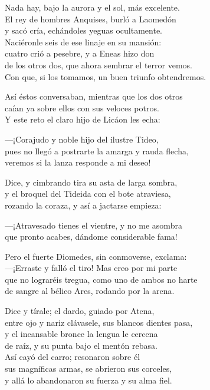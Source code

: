 Nada hay, bajo la aurora y el sol, más excelente.\\
El rey de hombres Anquises, burló a Laomedón\\
y sacó cría, echándoles yeguas ocultamente.\\
Naciéronle seis de ese linaje en su mansión:\\
cuatro crió a pesebre, y a Eneas hizo don\\
de los otros dos, que ahora sembrar el terror vemos.\\
Con que, si los tomamos, un buen triunfo obtendremos.\par
Así éstos conversaban, mientras que los dos otros\\
caían ya sobre ellos con sus veloces potros.\\
Y este reto el claro hijo de Licáon les echa:\par
---¡Corajudo y noble hijo del ilustre Tideo,\\
pues no llegó a postrarte la amarga y rauda flecha,\\
veremos si la lanza responde a mi deseo!\par
Dice, y cimbrando tira su asta de larga sombra,\\
y el broquel del Tideida con el bote atraviesa,\\
rozando la coraza, y así a jactarse empieza:\par
---¡Atravesado tienes el vientre, y no me asombra\\
que pronto acabes, dándome considerable fama!\par
Pero el fuerte Diomedes, sin conmoverse, exclama:\\
---¡Erraste y falló el tiro! Mas creo por mi parte\\
que no lograréis tregua, como uno de ambos no harte\\
de sangre al bélico Ares, rodando por la arena.\par
Dice y tírale; el dardo, guiado por Atena,\\
entre ojo y nariz clávasele, sus blancos dientes pasa,\\
y el incansable bronce la lengua le cercena\\
de raíz, y su punta bajo el mentón rebasa.\\
Así cayó del carro; resonaron sobre él\\
sus magníficas armas, se abrieron sus corceles,\\
y allá lo abandonaron su fuerza y su alma fiel.\par

